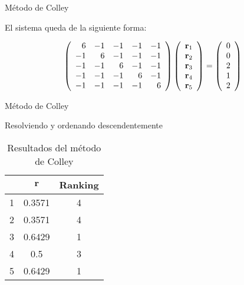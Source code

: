 \documentclass[10pt]{beamer}
\begin{document}
	\begin{frame}{Método de Colley}
		\begin{ejemplo}[continuación]
			El sistema queda de la siguiente forma:
			
			\begin{equation*}
			\left(\begin{array}{r r r r r}
			6 & -1 & -1 & -1 & -1\\
			-1 &  6 & -1 & -1 & -1\\
			-1 & -1 &  6 & -1 & -1\\
			-1 & -1 & -1 &  6 & -1\\
			-1 & -1 & -1 & -1 &  6
			\end{array}\right)
			\left(\begin{array}{c}
			\mathbf{r}_1\\
			\mathbf{r}_2\\
			\mathbf{r}_3\\
			\mathbf{r}_4\\
			\mathbf{r}_5
			\end{array}\right)
			=
			\left(\begin{array}{c}
			0\\
			0\\
			2\\
			1\\
			2
			\end{array}\right)
			\end{equation*}
		\end{ejemplo}
		
	\end{frame}
	
	\begin{frame}{Método de Colley}
		\begin{ejemplo}[continuación]
			Resolviendo y ordenando descendentemente
			
			\begin{table}[h]
				\centering
				\caption{Resultados del método de Colley}
				\label{tbl:colley_con_empates}
				\begin{tabular}{@{}ccc@{}}
					\cmidrule(l){2-3}
					& $\mathbf{r}$ & Ranking \\ \midrule
					1 & 0.3571       & 4       \\
					2 & 0.3571       & 4       \\
					3 & 0.6429       & 1       \\
					4 & 0.5          & 3       \\
					5 & 0.6429       & 1       \\ \bottomrule
				\end{tabular}
			\end{table}
		\end{ejemplo}
		
	\end{frame}
	
\end{document}
